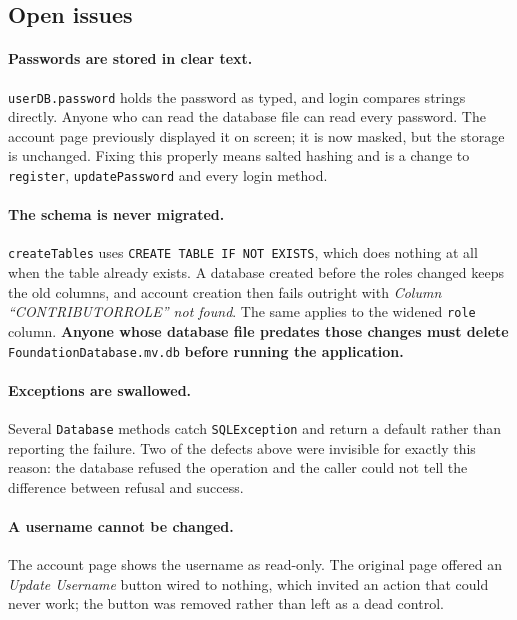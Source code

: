 \documentclass[11pt,a4paper]{article}
\newcommand{\cls}[1]{\texttt{#1}}
\begin{document}
\subsection{Open issues}

\paragraph{Passwords are stored in clear text.}
\label{iss:plaintext}
\texttt{userDB.password} holds the password as typed, and login compares strings directly.
Anyone who can read the database file can read every password. The account page previously
displayed it on screen; it is now masked, but the storage is unchanged. Fixing this properly
means salted hashing and is a change to \cls{register}, \cls{updatePassword} and every login
method.

\paragraph{The schema is never migrated.}
\label{iss:migrate}
\cls{createTables} uses \cls{CREATE TABLE IF NOT EXISTS}, which does nothing at all when the
table already exists. A database created before the roles changed keeps the old columns, and
account creation then fails outright with \textit{Column ``CONTRIBUTORROLE'' not found}. The
same applies to the widened \texttt{role} column. \textbf{Anyone whose database file predates
those changes must delete} \texttt{FoundationDatabase.mv.db} \textbf{before running the
application.}

\paragraph{Exceptions are swallowed.}
Several \cls{Database} methods catch \cls{SQLException} and return a default rather than
reporting the failure. Two of the defects above were invisible for exactly this reason: the
database refused the operation and the caller could not tell the difference between refusal
and success.

\paragraph{A username cannot be changed.}
The account page shows the username as read-only. The original page offered an
\textit{Update Username} button wired to nothing, which invited an action that could never
work; the button was removed rather than left as a dead control.
\end{document}
